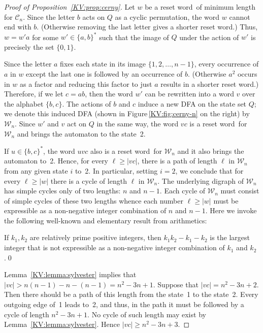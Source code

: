 \documentclass{irmaart}
\newcommand{\sw}{reset word}
\theoremstyle{plain}
\begin{document}
\begin{proof}[Proof of Proposition~\ref{KV:prop:cerny}]
Let $w$ be a \sw\ of minimum length for $\mathcal{C}_n$. Since the letter $b$
acts on $Q$ as a cyclic permutation, the word $w$ cannot end with $b$.
(Otherwise removing the last letter gives a shorter \sw.) Thus, $w = w'a$ for
some $w'\in\{a,b\}^*$ such that the image of $Q$ under the action of $w'$ is
precisely the set $\{0,1\}$.

Since the letter $a$ fixes each state in its image
$\{1,2,\dots,n-1\}$, every occurrence of $a$ in $w$ except the
last one is followed by an occurrence of $b$. (Otherwise $a^2$
occurs in $w$ as a factor and reducing this factor to just $a$
results in a shorter \sw.) Therefore, if we let $c=ab$, then the
word $w'$ can be rewritten into a word $v$ over the alphabet
$\{b,c\}$. The actions of $b$ and $c$ induce a new DFA on the
state set $Q$; we denote this induced DFA (shown in
Figure\,\ref{KV:fig:cerny-n} on the right) by $\mathcal{W}_n$.
Since $w'$ and $v$ act on $Q$ in the same way, the word $vc$ is a
\sw\ for $\mathcal{W}_n$ and brings the automaton to the state~2.

If $u\in\{b,c\}^*$, the word $uvc$ also is a \sw\ for
$\mathcal{W}_n$ and it also brings the automaton to~2. Hence, for
every $\ell\ge|vc|$, there is a path of length $\ell$ in
$\mathcal{W}_n$ from any given state $i$ to~2. In particular,
setting $i=2$, we conclude that for every $\ell\ge|w|$ there is a
cycle of length $\ell$ in $\mathcal{W}_n$. The underlying digraph
of $\mathcal{W}_n$ has simple cycles only of two lengths: $n$ and
$n-1$. Each cycle of $\mathcal{W}_n$ must consist of simple cycles
of these two lengths whence each number $\ell\ge|w|$ must be
expressible as a non-negative integer combination of $n$ and
$n-1$. Here we invoke the following well-known and elementary
result from arithmetics:

\begin{lemma}
\label{KV:lemma:sylvester} If $k_1,k_2$ are relatively prime positive integers,
then $k_1k_2-k_1-k_2$ is the largest integer that is not expressible as a
non-negative integer combination of $k_1$ and $k_2$.\qed
\end{lemma}

Lemma~\ref{KV:lemma:sylvester} implies that
$|vc|>n(n-1)-n-(n-1)=n^2-3n+1$. Suppose that $|vc|=n^2-3n+2$. Then
there should be a path of this length from the state~1 to the
state~2. Every outgoing edge of~1 leads to~2, and thus, in the
path it must be followed by a cycle of length $n^2-3n+1$. No cycle
of such length may exist by Lemma~\ref{KV:lemma:sylvester}. Hence
$|vc|\ge n^2-3n+3$.


\end{proof}
\end{document}
